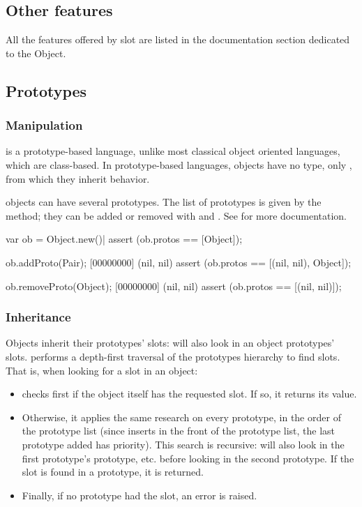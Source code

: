 \subsection{Other features}

All the features offered by slot are listed in the documentation section
dedicated to the  Object.

\subsection{Prototypes}

\subsubsection{Manipulation}

\us is a prototype-based language, unlike most classical object oriented
languages, which are class-based. In prototype-based languages, objects have
no type, only , from which they inherit behavior.

\us objects can have several prototypes. The list of prototypes is given by
the  method; they can be added or removed with
 and .  See
 for more documentation.

\begin{urbiscript}
var ob = Object.new()|
assert (ob.protos == [Object]);

ob.addProto(Pair);
[00000000] (nil, nil)
assert (ob.protos == [(nil, nil), Object]);

ob.removeProto(Object);
[00000000] (nil, nil)
assert (ob.protos == [(nil, nil)]);
\end{urbiscript}

\subsubsection{Inheritance}

Objects inherit their prototypes' slots:  will also
look in an object prototypes' slots.  performs a
depth-first traversal of the prototypes hierarchy to find slots. That is,
when looking for a slot in an object:

\begin{itemize}
\item {} checks first if the object itself has the
  requested slot. If so, it returns its value.
\item Otherwise, it applies the same research on every prototype, in the
  order of the prototype list (since  inserts in
  the front of the prototype list, the last prototype added has
  priority). This search is recursive:  will also
  look in the first prototype's prototype, etc. before looking in the second
  prototype. If the slot is found in a prototype, it is returned.
\item Finally, if no prototype had the slot, an error is raised.
\end{itemize}

